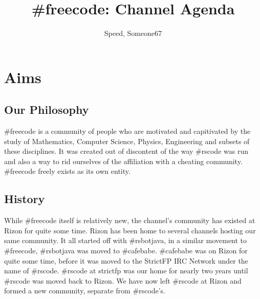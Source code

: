 \documentclass[11pt,a4paper,notitlepage]{article}
\title{\#freecode: Channel Agenda}
\author{Speed, Someone67}
\begin{document}
\maketitle

\section{Aims}
\subsection{Our Philosophy}
\#freecode is a community of people who are motivated and capitivated by the study of Mathematics, Computer Science, Physics, Engineering and subsets of these disciplines.
It was created out of  discontent of the way \#rscode was run and also a way to rid ourselves of the affiliation with a cheating community.
\#freecode freely exists as its own entity.

\subsection{History}
While \#freecode itself is relatively new, the channel's community has existed at Rizon for quite some time.
Rizon has been home to several channels hosting our same community.
It all started off with \#rsbotjava, in a similar movement to \#freecode, \#rsbotjava was moved to \#cafebabe.
\#cafebabe was on Rizon for quite some time, before it was moved to the StrictFP IRC Network under the name of \#rscode.
\#rscode at strictfp was our home for nearly two years until \#rscode was moved back to Rizon.
We have now left \#rscode at Rizon and formed a new community, separate from \#rscode's.
\end{document}
